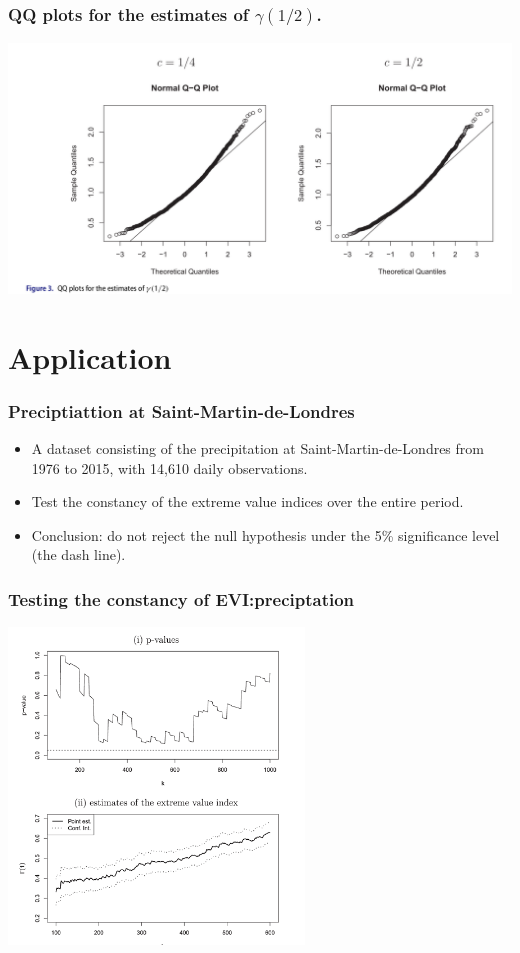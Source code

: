 \documentclass{beamer}
\begin{document}
\begin{frame}
    \frametitle{QQ plots for the estimates of $\gamma(1/2)$.}
    \begin{center}
        \includegraphics[width=1\textwidth]{figure3.png}
    \end{center}

    

\end{frame}
\section{Application}

\begin{frame}
    \frametitle{Preciptiattion at Saint-Martin-de-Londres}

\begin{itemize}
    \item A dataset consisting of the precipitation at Saint-Martin-de-Londres from 1976 to 2015, with 14,610 daily observations.
    \medskip
    \item Test the constancy of the extreme value indices over the entire period.
    \medskip
    \item Conclusion: do not reject the null hypothesis under the 5\% significance level (the dash line).
\end{itemize}
\end{frame}

\begin{frame}
    \frametitle{Testing the constancy of EVI:preciptation}
\begin{center}
    \includegraphics[width=0.59\textwidth]{image-20200429230720801}
\end{center}
    

\end{frame}
\end{document}
